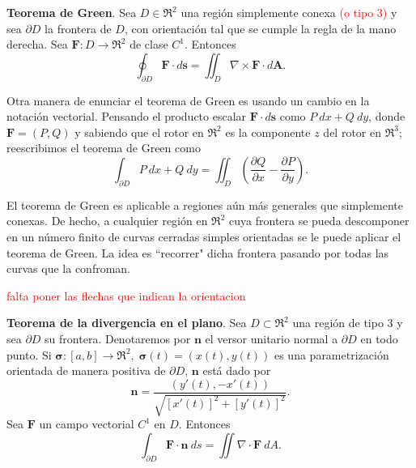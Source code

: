 \begin{theorem}
    \textbf{Teorema de Green}. Sea $D\in\Re^2$ una regi\'on simplemente conexa \textcolor{red}{(o tipo 3)} y sea $\partial D$ la frontera de $D$, con orientaci\'on tal que se cumple la regla de la mano derecha. Sea $\mathbf{F}:D\to\Re^2$ de clase $C^1$. Entonces
    \[
        \oint_{\partial D}\mathbf{F}\cdot d\mathbf{s} = \iint_D \nabla\times\mathbf{F}\cdot d\mathbf{A}.
    \]
\end{theorem}

Otra manera de enunciar el teorema de Green es usando un cambio en la notaci\'on vectorial. Pensando el producto escalar $\mathbf{F}\cdot d\mathbf{s}$ como $P\:dx+Q\:dy$, donde $\mathbf{F}=(P,Q)$ y sabiendo que el rotor en $\Re^2$ es la componente $z$ del rotor en $\Re^3$; reescribimos el teorema de Green como
\[
        \int_{\partial D}P\:dx+Q\:dy=\iint_D\left(\frac{\partial Q}{\partial x}-\frac{\partial P}{\partial y}\right).
\]

El teorema de Green es aplicable a regiones a\'un m\'as generales que simplemente conexas. De hecho, a cualquier regi\'on en $\Re^2$ cuya frontera se pueda descomponer en un n\'umero finito de curvas cerradas simples orientadas se le puede aplicar el teorema de Green. La idea es ``recorrer" dicha frontera pasando por todas las curvas que la confroman.

\begin{center}
\end{center}
\textcolor{red}{falta poner las flechas que indican la orientacion}

\begin{theorem}
\textbf{Teorema de la divergencia en el plano}. Sea $D\subset\Re^2$ una regi\'on de tipo 3 y sea $\partial D$ su frontera. Denotaremos por $\mathbf{n}$ el versor unitario normal a $\partial D$ en todo punto. Si $\boldsymbol{\sigma}:[a,b]\to\Re^2,\;\boldsymbol{\sigma}(t)=(x(t),y(t))$ es una parametrizaci\'on orientada de manera positiva de $\partial D$, $\mathbf{n}$ est\'a dado por 
\[
    \mathbf{n}=\frac{(y'(t),-x'(t))}{\sqrt{[x'(t)]^2+[y'(t)]^2}}.
\]
Sea $\mathbf{F}$ un campo vectorial $C^1$ en $D$. Entonces
\[
    \int_{\partial D}\mathbf{F}\cdot\mathbf{n}\:ds=\iint\nabla\cdot\mathbf{F}\:dA.
\]
\end{theorem}

